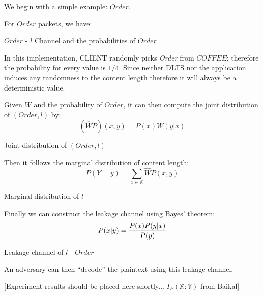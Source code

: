 \begin{example}
We begin with a simple example: $Order$.

For $Order$ packets, we have:

\begin{table}[H]
\begin{center}
{}
\end{center}
\caption{$Order$ - $l$ Channel and the probabilities of $Order$}
\label{Tbl: Order1}
\end{table}

In this implementation, CLIENT randomly picks \textit{Order} from $COFFEE$; therefore the probability for every value is $1/4$. Since neither DLTS nor the application induces any randomness to the content length therefore it will always be a deterministic value.

Given $W$ and the probability of $Order$, it can then compute the joint distribution of $(Order, l)$ by:
\begin{equation}
(\widehat{W}P)(x,y) = P(x)W(y|x)
\end{equation}

\begin{table}[H]
\begin{center}
{}
\end{center}
\caption{Joint distribution of $(Order, l)$}
\label{Tbl: Order2}
\end{table}

Then it follows the marginal distribution of content length:
\begin{equation}
P(Y=y) = \sum\limits_{x \in \mathbb{X}}{\widehat{W}P(x,y)}
\end{equation}

\begin{table}[H]
\begin{center}
{}
\end{center}
\caption{Marginal distribution of $l$}
\label{Tbl: Order3}
\end{table}

Finally we can construct the leakage channel using Bayes’ theorem:
\begin{equation}
P(x|y) = {{P(x)P(y|x)} \over {P(y)}}
\end{equation}
\begin{table}[H]
\begin{center}
{}
\end{center}
\caption{Leakage channel of $l$ - $Order$}
\label{Tbl: Order4}
\end{table}

An adversary can then “decode” the plaintext using this leakage channel.


[Experiment results should be placed here shortly... $I_{P}(\mathbb{X} : \mathbb{Y})$ from Baikal]
\end{example}

